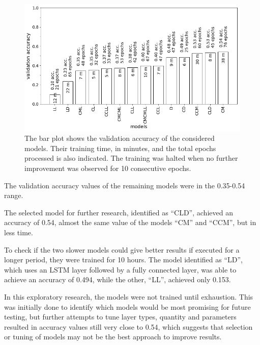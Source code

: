 \noindent
\begin{figure}[htb!]
\centering\includegraphics[width=1.0\textwidth]{content/models.png}
\caption{\label{fig:models}The bar plot shows the validation accuracy of the considered models. Their training time, in minutes, and the total epochs processed is also indicated. The training was halted when no further improvement was observed for 10 consecutive epochs.}%
\end{figure}


The validation accuracy values of the remaining models were in the 0.35-0.54 range.

The selected model for further research, identified as ``CLD'', achieved an accuracy of 0.54, almost the same value of the models ``CM'' and ``CCM'', but in less time.

To check if the two slower models could give better results if executed for a longer period, they were trained for 10 hours. The model identified as ``LD'', which uses an LSTM layer followed by a fully connected layer, was able to achieve an accuracy of 0.494, while the other, ``LL'', achieved only 0.153.


In this exploratory research, the models were not trained until exhaustion. This was initially done to identify which models would be most promising for future testing, but further attempts to tune layer types, quantity and parameters resulted in accuracy values still very close to 0.54, which suggests that selection or tuning of models may not be the best approach to improve results.
